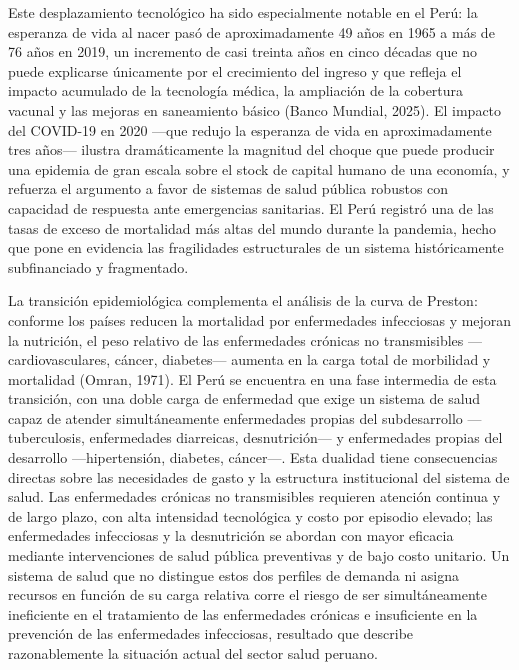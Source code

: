 \documentclass[12pt]{article}
\begin{document}
Este desplazamiento tecnológico ha sido especialmente notable en el Perú: la esperanza de vida al
nacer pasó de aproximadamente 49 años en 1965 a más de 76 años en 2019, un incremento de casi
treinta años en cinco décadas que no puede explicarse únicamente por el crecimiento del ingreso y
que refleja el impacto acumulado de la tecnología médica, la ampliación de la cobertura vacunal y
las mejoras en saneamiento básico (Banco Mundial, 2025). El impacto del COVID-19 en 2020
---que redujo la esperanza de vida en aproximadamente tres años--- ilustra dramáticamente la
magnitud del choque que puede producir una epidemia de gran escala sobre el stock de capital
humano de una economía, y refuerza el argumento a favor de sistemas de salud pública robustos
con capacidad de respuesta ante emergencias sanitarias. El Perú registró una de las tasas de exceso
de mortalidad más altas del mundo durante la pandemia, hecho que pone en evidencia las
fragilidades estructurales de un sistema históricamente subfinanciado y fragmentado.

La transición epidemiológica complementa el análisis de la curva de Preston: conforme los países
reducen la mortalidad por enfermedades infecciosas y mejoran la nutrición, el peso relativo de las
enfermedades crónicas no transmisibles ---cardiovasculares, cáncer, diabetes--- aumenta en la
carga total de morbilidad y mortalidad (Omran, 1971). El Perú se encuentra en una fase intermedia
de esta transición, con una doble carga de enfermedad que exige un sistema de salud capaz de
atender simultáneamente enfermedades propias del subdesarrollo ---tuberculosis, enfermedades
diarreicas, desnutrición--- y enfermedades propias del desarrollo ---hipertensión, diabetes,
cáncer---. Esta dualidad tiene consecuencias directas sobre las necesidades de gasto y la estructura
institucional del sistema de salud. Las enfermedades crónicas no transmisibles requieren atención
continua y de largo plazo, con alta intensidad tecnológica y costo por episodio elevado; las
enfermedades infecciosas y la desnutrición se abordan con mayor eficacia mediante intervenciones
de salud pública preventivas y de bajo costo unitario. Un sistema de salud que no distingue estos
dos perfiles de demanda ni asigna recursos en función de su carga relativa corre el riesgo de ser
simultáneamente ineficiente en el tratamiento de las enfermedades crónicas e insuficiente en la
prevención de las enfermedades infecciosas, resultado que describe razonablemente la situación
actual del sector salud peruano.

\end{document}
